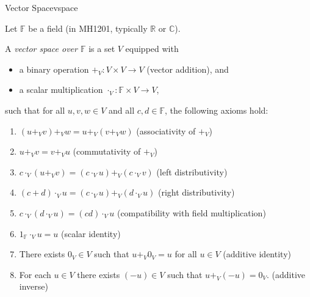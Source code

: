 \begin{definition}{Vector Space}{vspace}

Let $\mathbb{F}$ be a field (in MH1201, typically $\mathbb{R}$ or $\mathbb{C}$).

A \emph{vector space over $\mathbb{F}$} is a set $V$ equipped with

\begin{itemize}[leftmargin=*]

\item a binary operation $+_V : V\times V \to V$ (vector addition), and

\item a scalar multiplication $\cdot_V : \mathbb{F}\times V \to V$,

\end{itemize}

such that for all $u,v,w\in V$ and all $c,d\in \mathbb{F}$, the following axioms hold:

\begin{enumerate}[label=(VS\arabic*), leftmargin=*]

\item $(u+_V v)+_V w = u+_V (v+_V w)$ \hfill (associativity of $+_V$)

\item $u+_V v = v+_V u$ \hfill (commutativity of $+_V$)

\item $c\cdot_V (u+_V v) = (c\cdot_V u)+_V (c\cdot_V v)$ \hfill (left distributivity)

\item $(c+d)\cdot_V u = (c\cdot_V u)+_V (d\cdot_V u)$ \hfill (right distributivity)

\item $c\cdot_V (d\cdot_V u) = (cd)\cdot_V u$ \hfill (compatibility with field multiplication)

\item $1_{\mathbb{F}}\cdot_V u = u$ \hfill (scalar identity)

\item There exists $0_V\in V$ such that $u+_V 0_V=u$ for all $u\in V$ \hfill (additive identity)

\item For each $u\in V$ there exists $(-u)\in V$ such that $u+_V (-u)=0_V$. \hfill (additive inverse)

\end{enumerate}

\end{definition}

